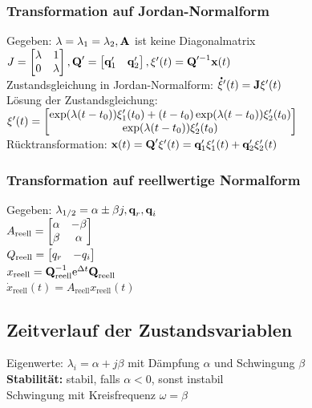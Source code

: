 \documentclass[fs, footer]{latex4ei}
\begin{document}
\begin{multicols*}{4}
		\subsubsection{Transformation auf Jordan-Normalform}
		Gegeben: $\lambda = \lambda_1 = \lambda_2, \textbf{A}$ ist keine Diagonalmatrix\\
		$J = \begin{bmatrix} \lambda & 1 \\ 0 & \lambda \end{bmatrix}, \textbf{Q}' = \begin{bmatrix} \textbf{q}_1' & \textbf{q}_2' \end{bmatrix}, \xi'(t) = \textbf{Q}'^{-1}\textbf{x}(t)$\\
		Zustandsgleichung in Jordan-Normalform: $\accentset{\mbox{\textrm{\large\bfseries .}} }{\xi} '(t) = \textbf{J} \xi '(t)$\\
		Lösung der Zustandsgleichung:\\ $\xi '(t) = \begin{bmatrix} \exp(\lambda(t-t_0))\xi_1'(t_0)+(t-t_0)\exp(\lambda(t-t_0))\xi_2'(t_0) \\ \exp(\lambda(t-t_0))\xi_2'(t_0)  \end{bmatrix}$\\
		Rücktransformation: $\textbf{x}(t) = \textbf{Q}'\xi '(t) = \textbf{q}_1'\xi_1'(t) + \textbf{q}_2'\xi_2'(t)$\\
		\subsubsection{Transformation auf reellwertige Normalform}
		Gegeben: $\lambda_{1/2} = \alpha \pm \beta j, \textbf{q}_r, \textbf{q}_i$\\
		$A_\text{reell} =  \begin{bmatrix} \alpha & - \beta \\ \beta & \alpha \end{bmatrix}$\\
		$Q_\text{reell} = \begin{bmatrix}  q_r & - q_i \end{bmatrix}$\\
		$x_\text{reell} = \textbf{Q}_\text{reell}^{-1} \mathrm{e}^{\Delta t}\textbf{Q}_\text{reell}$\\
		$\dot{x}_\text{reell} (t) = A_\text{reell}x_\text{reell}(t)$\\ 
		\subsection{Zeitverlauf der Zustandsvariablen}
		Eigenwerte: $\lambda_i = \alpha + j\beta$ mit Dämpfung $\alpha$ und Schwingung $\beta$\\
		\textbf{Stabilität:} stabil, falls $\alpha < 0$, sonst instabil\\
		Schwingung mit Kreisfrequenz $\omega = \beta$\\

\end{multicols*}
\end{document}

